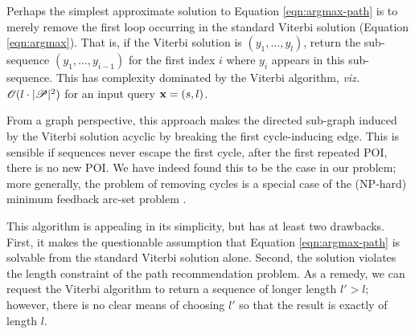 
Perhaps the simplest approximate solution to Equation \ref{eqn:argmax-path} is to merely remove the first loop occurring in the standard Viterbi solution (Equation \ref{eqn:argmax}).
That is, if the Viterbi solution is $( y_1, \ldots, y_l )$,
return the sub-sequence $( y_1, \ldots, y_{i-1} )$
for the first index $i$ where $y_i$ appears in this sub-sequence.
This has complexity dominated by the Viterbi algorithm, \emph{viz.} $\mathscr{O}(l \cdot |\mathscr{P}|^2)$ for an input query $\mathbf{x} = (s, l)$.

From a graph perspective, this approach makes the directed sub-graph induced by the Viterbi solution acyclic
by breaking the first cycle-inducing edge.
This is sensible if sequences never escape the first cycle, \ie after the first repeated POI, there is no new POI.
We have indeed found this to be the case in our problem; %
more generally, %
the problem of removing cycles is a special case of the ({\sf NP}-hard) minimum feedback arc-set problem \citep[pg.\ 192]{Garey:1990}.

This algorithm is appealing in its simplicity,
but has at least two drawbacks.
First, it makes the questionable assumption that Equation \ref{eqn:argmax-path} is solvable from the standard Viterbi solution alone.
Second, the solution violates the length constraint of the path recommendation problem.
As a remedy, we can request the Viterbi algorithm to return a sequence of longer length $l' > l$;
however, there is no clear means of choosing $l'$ so that the result is exactly of length $l$.

